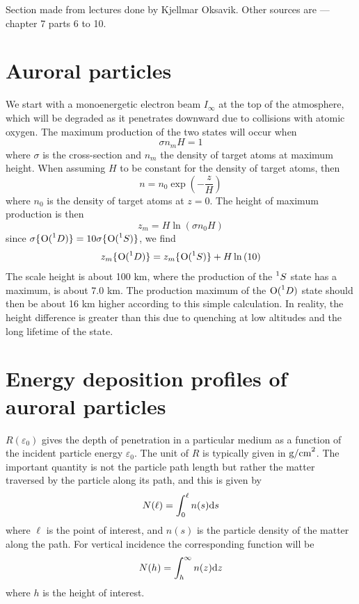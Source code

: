 \begin{remark}
    Section made from lectures done by Kjellmar Oksavik. Other sources are \citet{BrekkeAsgeir2013Potu} --- chapter 7 parts 6 to 10.
\end{remark}
\section{Auroral particles}
We start with a monoenergetic electron beam \(I_\infty \) at the top of the atmosphere, which will be degraded as it penetrates downward due to collisions with atomic oxygen. The maximum production of the two states will occur when
\begin{equation*}
    \sigma n_{m}H=1
\end{equation*}
where \(\sigma \) is the cross-section and \(n_m\) the density of target atoms at maximum height. When assuming \(H\) to be constant for the density of target atoms, then
\begin{equation*}
    n=n_0\exp\left(-\frac{z}{H}\right)
\end{equation*}
where \(n_0\) is the density of target atoms at \(z=0\). The height of maximum production is then
\begin{equation*}
    z_m=H\ln\left(\sigma n_0H\right)
\end{equation*}
since \(\sigma \{\prescript{}{}{\textnormal{O}}(\prescript{1}{}{D})\}=10\sigma \{\prescript{}{}{\textnormal{O}}(\prescript{1}{}{S})\} \), we find
\begin{equation*}
    z_m\{\prescript{}{}{\textnormal{O}}(\prescript{1}{}{D})\}=z_m\{\prescript{}{}{\textnormal{O}}(\prescript{1}{}{S})\}+H\ln\left(10\right)
\end{equation*}
The scale height is about 100 km, where the production of the \(\prescript{1}{}{S}\) state has a maximum, is about 7.0 km. The production maximum of the \(\prescript{}{}{\textnormal{O}}(\prescript{1}{}{D})\) state should then be about 16 km higher according to this simple calculation. In reality, the height difference is greater than this due to quenching at low altitudes and the long lifetime of the state.

\section{Energy deposition profiles of auroral particles}
\(R(\varepsilon_0)\) gives the depth of penetration in a particular medium as a function of the incident particle energy \(\varepsilon_0\). The unit of \(R\) is typically given in \(\textnormal{g/cm}^2\). The important quantity is not the particle path length but rather the matter traversed by the particle along its path, and this is given by
\begin{equation*}
    N(\ell)=\int_0^\ell n(s)\textnormal{d}s
\end{equation*}
where \(\ell \) is the point of interest, and \(n(s)\) is the particle density of the matter along the path. For vertical incidence the corresponding function will be
\begin{equation*}
    N(h)=\int_h^\infty n(z)\textnormal{d}z
\end{equation*}
where \(h\) is the height of interest.

